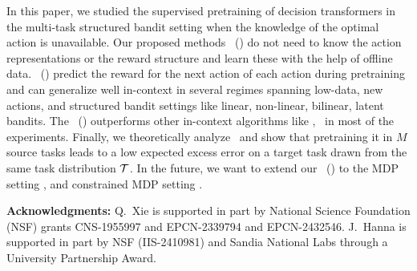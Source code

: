 In this paper, we studied the supervised pretraining of decision transformers in the multi-task structured bandit setting when the knowledge of the optimal action is unavailable.
%
Our proposed methods \pred\ (\gt) do not need to know the action representations or the reward structure and learn these with the help of offline data. 
%
\pred\ (\gt) predict the reward for the next action of each action during pretraining and can generalize well in-context in several regimes spanning low-data, new actions, and structured bandit settings like linear, non-linear, bilinear, latent bandits. The \pred\ (\gt) outperforms other in-context algorithms like \ad, \dptg\ in most of the experiments. Finally, we theoretically analyze \predt\ and show that pretraining it in $M$ source tasks leads to a low expected excess error on a target task drawn from the same task distribution $\mathcal{T}$.
%
%
%
%
In the future, we want to extend our \pred\ (\gt) to the MDP setting \citep{sutton2018reinforcement, agarwal2019reinforcement}, and constrained MDP setting \citep{efroni2020exploration, gu2022review}.

\textbf{Acknowledgments:} Q.\ Xie is supported in part by National Science Foundation (NSF) grants CNS-1955997 and EPCN-2339794 and EPCN-2432546. J.\ Hanna is supported in part by NSF (IIS-2410981) and Sandia National Labs through a University Partnership Award.